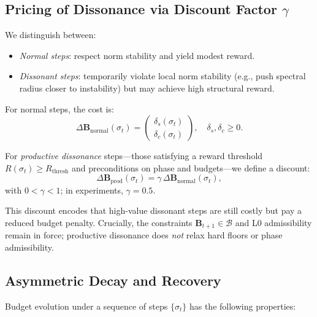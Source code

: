 \documentclass[11pt]{article}
\begin{document}
\subsection{Pricing of Dissonance via Discount Factor \texorpdfstring{\(\gamma\)}{gamma}}

We distinguish between:

\begin{itemize}[itemsep=2pt]
  \item \emph{Normal steps}: respect norm stability and yield modest reward.
  \item \emph{Dissonant steps}: temporarily violate local norm stability (e.g., push spectral radius closer to instability) but may achieve high structural reward.
\end{itemize}

For normal steps, the cost is:
\begin{equation}
  \Delta \mathbf{B}_{\mathrm{normal}}(\sigma_t) = 
  \begin{pmatrix}
    \delta_s(\sigma_t) \\ \delta_c(\sigma_t)
  \end{pmatrix}, \quad \delta_s, \delta_c \ge 0.
\end{equation}

For \emph{productive dissonance} steps---those satisfying a reward threshold \(R(\sigma_t) \ge R_{\mathrm{thresh}}\) and preconditions on phase and budgets---we define a discount:
\begin{equation}
  \Delta \mathbf{B}_{\mathrm{prod}}(\sigma_t) = 
  \gamma \, \Delta \mathbf{B}_{\mathrm{normal}}(\sigma_t),
\end{equation}
with \(0 < \gamma < 1\); in experiments, \(\gamma = 0.5\).

This discount encodes that high-value dissonant steps are still costly but pay a reduced budget penalty. Crucially, the constraints \(\mathbf{B}_{t+1} \in \mathcal{B}\) and L0 admissibility remain in force; productive dissonance does \emph{not} relax hard floors or phase admissibility.

\subsection{Asymmetric Decay and Recovery}

Budget evolution under a sequence of steps \(\{\sigma_t\}\) has the following properties:
\end{document}
